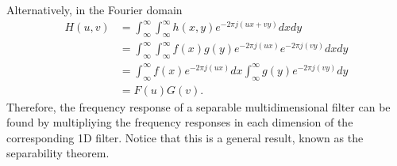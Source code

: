 \documentclass{article}
\begin{document}
Alternatively, in the Fourier domain
\begin{equation*}
  \begin{split}
    H(u,v) & = \int_\infty^\infty\int_\infty^\infty h(x,y)e^{-2\pi j(ux+vy)}dxdy \\
           & = \int_\infty^\infty\int_\infty^\infty f(x)g(y)e^{-2\pi j(ux)}e^{-2\pi j(vy)}dxdy \\
           & = \int_\infty^\infty f(x)e^{-2\pi j(ux)} dx \int_\infty^\infty g(y) e^{-2\pi j(vy)} dy \\
           & = F(u)G(v).
  \end{split}
\end{equation*}
Therefore, the frequency response of a separable multidimensional
filter can be found by multipliying the frequency responses in each
dimension of the corresponding 1D filter. Notice that this is a
general result, known as the separability theorem.

\end{document}
